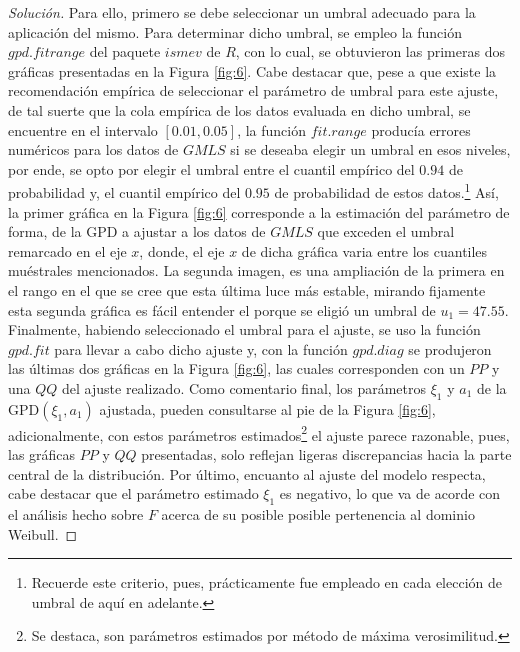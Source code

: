 \documentclass[10.5pt,notitlepage]{article}
\newenvironment{solucion}
  {\begin{proof}[Solución]}
  {\end{proof}}
\theoremstyle{plain}
\begin{document}
\begin{solucion}
Para ello, primero se debe seleccionar un umbral adecuado para la aplicación del mismo. Para determinar dicho umbral, se empleo la función \(gpd.fitrange\) del paquete \(ismev\) de \(R\), con lo cual, se obtuvieron las primeras dos gráficas presentadas en la Figura \ref{fig:6}. Cabe destacar que, pese a que existe la recomendación empírica de seleccionar el parámetro de umbral para este ajuste, de tal suerte que la cola empírica de los datos evaluada en dicho umbral, se encuentre en el intervalo \([0.01, 0.05]\),  la función \(fit.range\) producía errores numéricos para los datos de \(GMLS\) si se deseaba elegir un umbral en esos niveles, por ende, se opto por elegir el umbral entre el cuantil empírico del \(0.94\) de probabilidad y, el cuantil empírico del \(0.95\) de probabilidad de estos datos.\footnote{Recuerde este criterio, pues, prácticamente fue empleado en cada elección de umbral de aquí en adelante.} Así, la primer gráfica en la Figura \ref{fig:6} corresponde a la estimación del parámetro de forma, de la GPD a ajustar a los datos de \(GMLS\) que exceden el umbral remarcado en el eje \(x\), donde, el eje \(x\) de dicha gráfica varia entre los cuantiles muéstrales mencionados. La segunda imagen, es una ampliación de la primera en el rango en el que se cree que esta última luce más estable, mirando fijamente esta segunda gráfica es fácil entender el porque se eligió un umbral de \(u_1 = 47.55\). Finalmente, habiendo seleccionado el umbral para el ajuste, se uso la función \(gpd.fit\) para llevar a cabo dicho ajuste y, con la función \(gpd.diag\) se produjeron las últimas dos gráficas en la Figura \ref{fig:6}, las cuales corresponden con un \(PP\) y una \(QQ\) del ajuste realizado. Como comentario final, los parámetros \(\xi_1\) y \(a_1\) de la GPD\((\xi_1,a_1)\) ajustada, pueden consultarse al pie de la Figura \ref{fig:6}, adicionalmente, con estos parámetros estimados\footnote{Se destaca, son parámetros estimados por método de máxima verosimilitud.} el ajuste parece razonable, pues, las gráficas \(PP\) y \(QQ\) presentadas, solo reflejan ligeras discrepancias hacia la parte central de la distribución. Por último, encuanto al ajuste del modelo respecta, cabe destacar que el parámetro estimado \(\xi_1\) es negativo, lo que va de acorde con el análisis hecho sobre \(F\) acerca de su posible posible pertenencia al dominio Weibull. 


\end{solucion}
\end{document}
